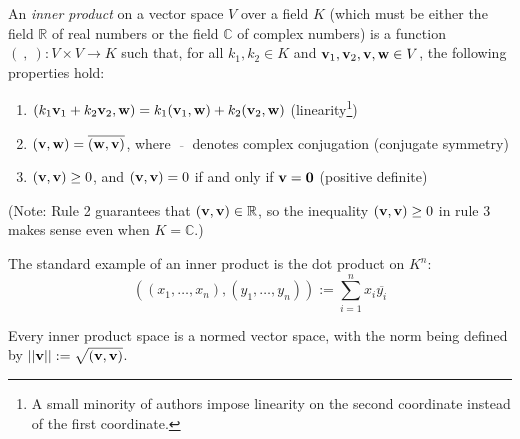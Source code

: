 \documentclass[12pt]{article}
\renewcommand{\v}{{{\bf v}}}
\newcommand{\w}{{{\bf w}}}
\newcommand{\0}{{{\bf 0}}}
\begin{document}
An \emph{inner product} on a vector space $V$ over a field $K$ (which must be either the field $\mathbb{R}$ of real numbers or the field $\mathbb{C}$ of complex numbers) is a function $(\ ,\ ): V \times V \longrightarrow K$ such that, for all $k_1,k_2 \in K$ and $\v_1, \v_2, \v, \w \in V$, the following properties hold:
\begin{enumerate}
\item $(k_1 \v_1 + k_2 \v_2, \w) = k_1 (\v_1, \w) + k_2 (\v_2, \w)$ (linearity\footnote{A small minority of authors impose linearity on the second coordinate instead of the first coordinate.})
\item $(\v, \w) = \overline{(\w, \v)}$, where $\overline{\ \ \ \ }$ denotes complex conjugation (conjugate symmetry)
\item $(\v, \v) \geq 0$, and $(\v, \v) = 0$ if and only if $\v = \0$ (positive definite)
\end{enumerate}

(Note: Rule 2 guarantees that $(\v,\v) \in \mathbb{R}$, so the inequality $(\v,\v) \geq 0$ in rule 3 makes sense even when $K=\mathbb{C}$.)

The standard example of an inner product is the dot product on $K^n$:
$$
((x_1,\dots,x_n), (y_1,\dots,y_n)) := \sum_{i=1}^n x_i \overline{y_i}
$$

Every inner product space is a normed vector space, with the norm being defined by $||\v|| := \sqrt{(\v,\v)}$.
\end{document}
